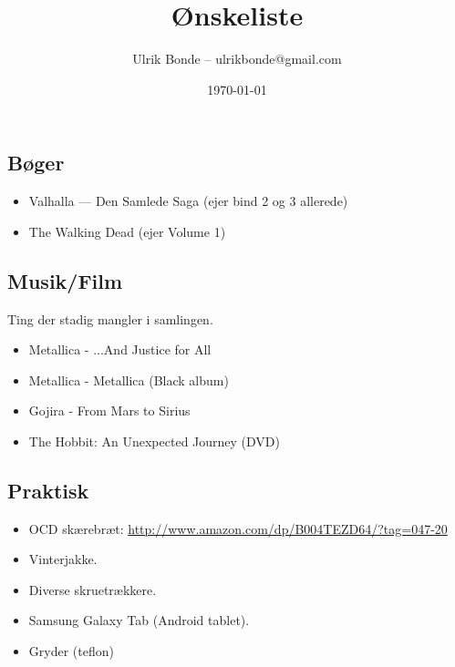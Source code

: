 \documentclass[a4paper, danish, 10pt, final]{article}
\title{Ønskeliste}
\author{Ulrik Bonde -- ulrikbonde@gmail.com}
\date{\today}
\begin{document}
\maketitle

\subsection*{Bøger}

\begin{itemize}
    \item Valhalla --- Den Samlede Saga (ejer bind 2 og 3 allerede)
    \item The Walking Dead (ejer Volume 1)
\end{itemize}


\subsection*{Musik/Film}
Ting der stadig mangler i samlingen.
\begin{itemize}
    \item Metallica - ...And Justice for All
    \item Metallica - Metallica (Black album)
    \item Gojira - From Mars to Sirius
    \item The Hobbit: An Unexpected Journey (DVD)
\end{itemize}


\subsection*{Praktisk}
\begin{itemize}
    \item OCD skærebræt: \url{http://www.amazon.com/dp/B004TEZD64/?tag=047-20}
    \item Vinterjakke.
    \item Diverse skruetrækkere.
    \item Samsung Galaxy Tab (Android tablet).
    \item Gryder (teflon)
\end{itemize}


%
%
\end{document}
